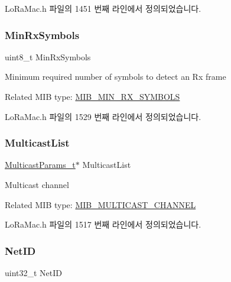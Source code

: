 Lo\+Ra\+Mac.\+h 파일의 1451 번째 라인에서 정의되었습니다.

\mbox{\label{unionu_mib_param_ab33f97482f9af163d593cf103a2ccf1c}} 
\subsubsection{\texorpdfstring{Min\+Rx\+Symbols}{MinRxSymbols}}
{\footnotesize\ttfamily uint8\+\_\+t Min\+Rx\+Symbols}

Minimum required number of symbols to detect an Rx frame

Related M\+IB type\+: \mbox{\hyperlink{group___l_o_r_a_m_a_c_gga32ea83d13a3f5bb4b3ec2ace2319ab61a82fb27fd6414d2bde20a7a00c80e26a1}{M\+I\+B\+\_\+\+M\+I\+N\+\_\+\+R\+X\+\_\+\+S\+Y\+M\+B\+O\+LS}} 

Lo\+Ra\+Mac.\+h 파일의 1529 번째 라인에서 정의되었습니다.

\mbox{\label{unionu_mib_param_ab0f9cda74f301d191aa5f7d7090c1557}} 
\subsubsection{\texorpdfstring{Multicast\+List}{MulticastList}}
{\footnotesize\ttfamily \mbox{\hyperlink{group___l_o_r_a_m_a_c_ga02d2523505cac70954c043074087ea65}{Multicast\+Params\+\_\+t}}$\ast$ Multicast\+List}

Multicast channel

Related M\+IB type\+: \mbox{\hyperlink{group___l_o_r_a_m_a_c_gga32ea83d13a3f5bb4b3ec2ace2319ab61af8ac424460fccb3115c6fe6ccb450862}{M\+I\+B\+\_\+\+M\+U\+L\+T\+I\+C\+A\+S\+T\+\_\+\+C\+H\+A\+N\+N\+EL}} 

Lo\+Ra\+Mac.\+h 파일의 1517 번째 라인에서 정의되었습니다.

\mbox{\label{unionu_mib_param_a84a14c879508144e9961372ace234169}} 
\subsubsection{\texorpdfstring{Net\+ID}{NetID}}
{\footnotesize\ttfamily uint32\+\_\+t Net\+ID}

